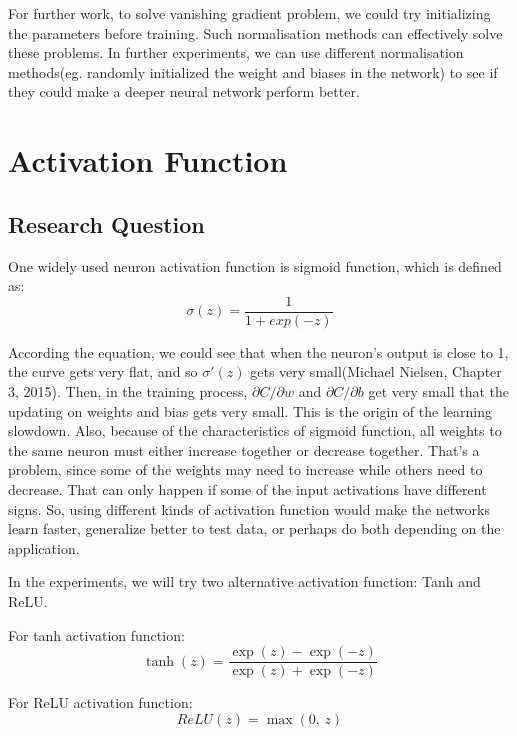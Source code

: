 \documentclass[]{article}
\begin{document}
For further work, to solve vanishing gradient problem, we could try initializing the parameters before training. Such normalisation methods can effectively solve these problems. In further experiments, we can use different normalisation methods(eg. randomly initialized the weight and biases in the network) to see if they could make a deeper neural network perform better.

\section{Activation Function}
\subsection{Research Question}
One widely used neuron activation function is sigmoid function, which is defined as:
\begin{equation*}
\sigma(z) = \frac{1}{1+exp(-z)}
\end{equation*}
 
According the equation, we could see that when the neuron's output is close to 1, the curve gets very flat, and so $\sigma'(z)$ gets very small(Michael Nielsen, Chapter 3, 2015). Then, in the training process, $\partial C/\partial w$ and $\partial C/ \partial b$ get very small that the updating on weights and bias gets very small. This is the origin of the learning slowdown. Also, because of the characteristics of sigmoid function, all weights to the same neuron must either increase together or decrease together. That's a problem, since some of the weights may need to increase while others need to decrease. That can only happen if some of the input activations have different signs. So, using different kinds of activation function would make the networks learn faster, generalize better to test data, or perhaps do both depending on the application.

In the experiments, we will try two alternative activation function: Tanh and ReLU. 

For tanh activation function:
\begin{equation*}
    \tanh\left(z\right) = 
    \frac{\exp\left(z\right) - \exp\left(-z\right)}{\exp\left(z\right) + \exp\left(-z\right)}
\end{equation*}

For ReLU activation function:
\begin{equation*}
    ReLU(z) = 
    \max\left(0,\,z\right)
\end{equation*}
\end{document}
